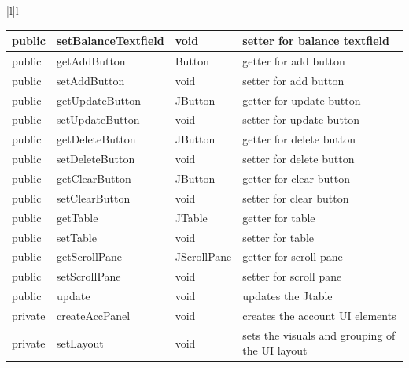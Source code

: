 \documentclass[12pt]{article}
\begin{document}
\begin{center}
\begin{tabular}{|l|l|}
\begin{tabular}{l|l|l|p{5cm}}
public  &setBalanceTextfield&void&setter for balance textfield\\ \hline 
public  &getAddButton&Button&getter for add button\\ \hline 
public  &setAddButton&void&setter for add button\\ \hline 
public  &getUpdateButton&JButton&getter for update button\\ \hline 
public  &setUpdateButton&void&setter for update button\\ \hline 
public  &getDeleteButton&JButton&getter for delete button\\ \hline 
public  &setDeleteButton&void&setter for delete button\\ \hline 
public  &getClearButton&JButton&getter for clear button\\ \hline 
public  &setClearButton&void&setter for clear button\\ \hline 
public  &getTable&JTable&getter for table\\ \hline 
public  &setTable&void&setter for table\\ \hline 
public  &getScrollPane&JScrollPane&getter for scroll pane\\ \hline 
public  &setScrollPane&void&setter for scroll pane\\ \hline 
public &update &void &updates the Jtable\\ \hline 
private &createAccPanel &void &creates the account UI elements\\ \hline 
private &setLayout &void &sets the visuals and grouping of the UI layout
\end{tabular} \\ \hline

\end{tabular}
\end{center}
\end{document}
